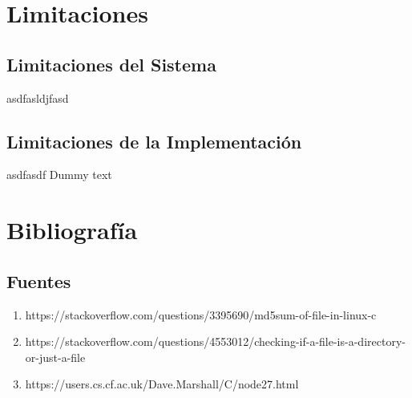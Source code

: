 \documentclass[10pt,a4paper]{report}
\begin{document}

\chapter{Limitaciones}
\section{Limitaciones del Sistema}
asdfasldjfasd

\section{Limitaciones de la Implementación}
asdfasdf
Dummy text


\chapter{Bibliografía}
\section{Fuentes}
\begin{enumerate}
\item https://stackoverflow.com/questions/3395690/md5sum-of-file-in-linux-c
\item https://stackoverflow.com/questions/4553012/checking-if-a-file-is-a-directory-or-just-a-file
\item https://users.cs.cf.ac.uk/Dave.Marshall/C/node27.html
\end{enumerate}
\end{document}
